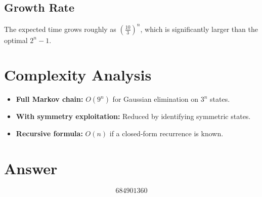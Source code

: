 \documentclass[11pt]{article}
\begin{document}
\subsection{Growth Rate}
The expected time grows roughly as $\left(\frac{10}{3}\right)^n$, which is significantly larger than the optimal $2^n - 1$.

\section{Complexity Analysis}
\begin{itemize}
    \item \textbf{Full Markov chain:} $O(9^n)$ for Gaussian elimination on $3^n$ states.
    \item \textbf{With symmetry exploitation:} Reduced by identifying symmetric states.
    \item \textbf{Recursive formula:} $O(n)$ if a closed-form recurrence is known.
\end{itemize}

\section{Answer}

\[
\boxed{684901360}
\]
\end{document}
